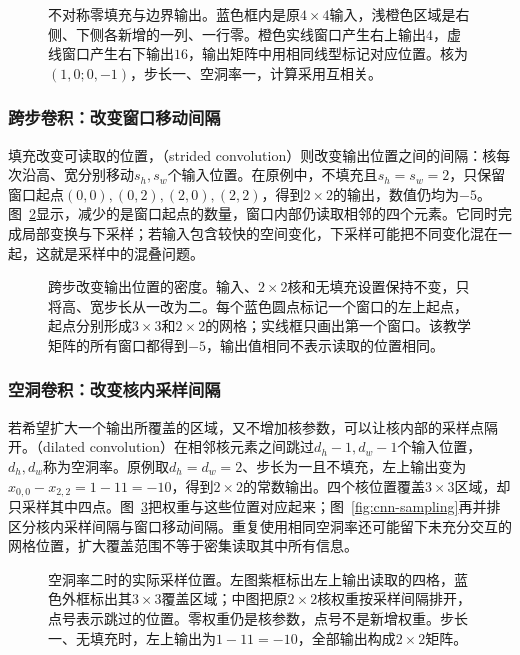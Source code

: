 \begin{figure}[htb]
  \centering
  
  \caption{不对称零填充与边界输出。蓝色框内是原$4\times4$输入，浅橙色区域是右侧、下侧各新增的一列、一行零。橙色实线窗口产生右上输出$4$，虚线窗口产生右下输出$16$，输出矩阵中用相同线型标记对应位置。核为$(1,0;0,-1)$，步长一、空洞率一，计算采用互相关。}
  \label{fig:cnn-padding}
\end{figure}
\subsubsection{跨步卷积：改变窗口移动间隔}
\label{sec:cnn-stride-operation}

填充改变可读取的位置，（strided convolution）则改变输出位置之间的间隔：核每次沿高、宽分别移动$s_h,s_w$个输入位置。在原例中，不填充且$s_h=s_w=2$，只保留窗口起点$(0,0),(0,2),(2,0),(2,2)$，得到$2\times2$的输出，数值仍均为$-5$。图~\ref{fig:cnn-stride}显示，减少的是窗口起点的数量，窗口内部仍读取相邻的四个元素。它同时完成局部变换与下采样；若输入包含较快的空间变化，下采样可能把不同变化混在一起，这就是采样中的混叠问题。


\begin{figure}[htb]
  \centering
  
  \caption{跨步改变输出位置的密度。输入、$2\times2$核和无填充设置保持不变，只将高、宽步长从一改为二。每个蓝色圆点标记一个窗口的左上起点，起点分别形成$3\times3$和$2\times2$的网格；实线框只画出第一个窗口。该教学矩阵的所有窗口都得到$-5$，输出值相同不表示读取的位置相同。}
  \label{fig:cnn-stride}
\end{figure}
\subsubsection{空洞卷积：改变核内采样间隔}
\label{sec:cnn-dilation-operation}

若希望扩大一个输出所覆盖的区域，又不增加核参数，可以让核内部的采样点隔开。（dilated convolution）在相邻核元素之间跳过$d_h-1,d_w-1$个输入位置，$d_h,d_w$称为空洞率。原例取$d_h=d_w=2$、步长为一且不填充，左上输出变为$x_{0,0}-x_{2,2}=1-11=-10$，得到$2\times2$的常数输出。四个核位置覆盖$3\times3$区域，却只采样其中四点。图~\ref{fig:cnn-dilation}把权重与这些位置对应起来；图~\ref{fig:cnn-sampling}再并排区分核内采样间隔与窗口移动间隔。重复使用相同空洞率还可能留下未充分交互的网格位置，扩大覆盖范围不等于密集读取其中所有信息。


\begin{figure}[htb]
  \centering
  
  \caption{空洞率二时的实际采样位置。左图紫框标出左上输出读取的四格，蓝色外框标出其$3\times3$覆盖区域；中图把原$2\times2$核权重按采样间隔排开，点号表示跳过的位置。零权重仍是核参数，点号不是新增权重。步长一、无填充时，左上输出为$1-11=-10$，全部输出构成$2\times2$矩阵。}
  \label{fig:cnn-dilation}
\end{figure}
